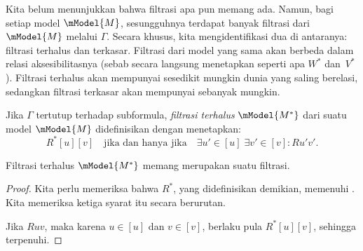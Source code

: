 \documentclass[../../../include/open-logic-section]{subfiles}
\begin{document}


Kita belum menunjukkan bahwa filtrasi apa pun memang ada. Namun, bagi setiap
model $\mModel{M}$, sesungguhnya terdapat banyak filtrasi dari $\mModel{M}$
melalui $\Gamma$. Secara khusus, kita mengidentifikasi dua di antaranya:
filtrasi terhalus dan terkasar. Filtrasi dari model yang sama akan berbeda
dalam relasi aksesibilitasnya (sebab  secara
langsung menetapkan seperti apa $W^*$ dan~$V^*$). Filtrasi terhalus akan
mempunyai sesedikit mungkin dunia yang saling berelasi, sedangkan filtrasi
terkasar akan mempunyai sebanyak mungkin.

\begin{defn}
  Jika $\Gamma$ tertutup terhadap subformula, \emph{filtrasi terhalus}
  $\mModel{M^*}$ dari suatu model $\mModel{M}$ didefinisikan dengan
  menetapkan:
  \[
  R^*[u][v] \quad \text{jika dan hanya jika} \quad \exists u'\in [u] \;
  \exists v' \in [v] : Ru'v'.
  \]
\end{defn}

\begin{prop}
  Filtrasi terhalus $\mModel{M^*}$ memang merupakan suatu filtrasi.
\end{prop}

\begin{proof}
  Kita perlu memeriksa bahwa $R^*$, yang didefinisikan demikian, memenuhi
  . Kita memeriksa
  ketiga syarat itu secara berurutan.

  Jika $Ruv$, maka karena $u \in [u]$ dan $v \in [v]$, berlaku pula
  $R^*[u][v]$, sehingga  terpenuhi.


\end{proof}
\end{document}
